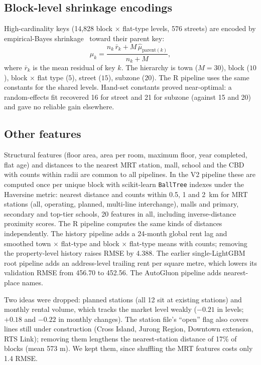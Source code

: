 \documentclass[conference]{IEEEtran}
\newif\ifshowsrc
\newcommand{\src}[1]{\ifshowsrc\textsuperscript{\tiny\color{gray}[#1]}\fi}
\begin{document}
\subsection{Block-level shrinkage encodings}
High-cardinality keys (14,828 block $\times$ flat-type levels, 576 streets) are encoded by empirical-Bayes shrinkage~\cite{micci}\src{Aa-fp,Me-cat} toward their parent key:
\begin{equation}
\hat\mu_k=\frac{n_k\,\bar r_k+M\,\hat\mu_{\mathrm{parent}(k)}}{n_k+M},\label{eq:te}
\end{equation}
where $\bar r_k$ is the mean residual of key $k$. The hierarchy is town ($M{=}30$), block ($10$), block $\times$ flat type ($5$), street ($15$), subzone ($20$).\src{Aa-M} The R pipeline uses the same constants for the shared levels.\src{Be-te} Hand-set constants proved near-optimal: a random-effects fit recovered 16 for street and 21 for subzone (against 15 and 20) and gave no reliable gain elsewhere.\src{Aa-gpb}

\subsection{Other features}
Structural features (floor area, area per room, maximum floor, year completed, flat age) and distances to the nearest MRT station, mall, school and the CBD with counts within radii\src{Be-spatial} are common to all pipelines. In the V2 pipeline these are computed once per unique block with scikit-learn \texttt{BallTree} indexes under the Haversine metric: nearest distance and counts within 0.5, 1 and 2~km for MRT stations (all, operating, planned, multi-line interchange), malls and primary, secondary and top-tier schools, 20 features in all, including inverse-distance proximity scores.\src{Aa-ball} The R pipeline computes the same kinds of distances independently. The history pipeline adds a 24-month global rent lag and smoothed town $\times$ flat-type and block $\times$ flat-type means with counts; removing the property-level history raises RMSE by 4.388.\src{Pu-hist,Pu-hist-abl} The earlier single-LightGBM root pipeline adds an address-level trailing rent per square metre, which lowers its validation RMSE from 456.70 to 452.56.\src{Aa-addr} The AutoGluon pipeline adds nearest-place names.\src{Me-feat}

Two ideas were dropped: planned stations (all 12 sit at existing stations) and monthly rental volume, which tracks the market level weakly ($-0.21$ in levels; $+0.18$ and $-0.22$ in monthly changes). The station file's ``open'' flag also covers lines still under construction (Cross Island, Jurong Region, Downtown extension, RTS Link); removing them lengthens the nearest-station distance of 17\% of blocks (mean 573 m). We kept them, since shuffling the MRT features costs only 1.4 RMSE.
\end{document}
